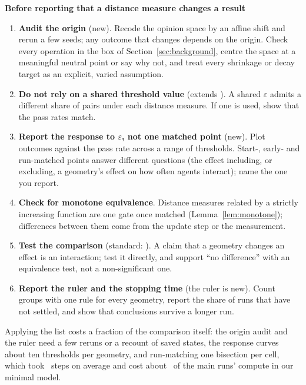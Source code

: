 \documentclass[11pt]{article}
\begin{document}
\begin{framed}
\noindent\textbf{Before reporting that a distance measure changes a result}
\begin{enumerate}
\item \textbf{Audit the origin} (new). Recode the opinion space by an affine shift and rerun a few seeds; any outcome that changes depends on the origin. Check every operation in the box of Section~\ref{sec:background}, centre the space at a meaningful neutral point or say why not, and treat every shrinkage or decay target as an explicit, varied assumption.
\item \textbf{Do not rely on a shared threshold value} (extends \citealp{lorenz2008}). A shared $\varepsilon$ admits a different share of pairs under each distance measure. If one is used, show that the pass rates match.
\item \textbf{Report the response to $\varepsilon$, not one matched point} (new). Plot outcomes against the pass rate across a range of thresholds. Start-, early- and run-matched points answer different questions (the effect including, or excluding, a geometry's effect on how often agents interact); name the one you report.
\item \textbf{Check for monotone equivalence}. Distance measures related by a strictly increasing function are one gate once matched (Lemma~\ref{lem:monotone}); differences between them come from the update step or the measurement.
\item \textbf{Test the comparison} (standard: \citealp{gelman2006,lakens2017}). A claim that a geometry changes an effect is an interaction; test it directly, and support ``no difference'' with an equivalence test, not a non-significant one.
\item \textbf{Report the ruler and the stopping time} (the ruler is new). Count groups with one rule for every geometry, report the share of runs that have not settled, and show that conclusions survive a longer run.
\end{enumerate}
\end{framed}
\noindent Applying the list costs a fraction of the comparison itself: the origin audit and the ruler need a few reruns or a recount of saved states, the response curves about ten thresholds per geometry, and run-matching one bisection per cell, which took \VCalIterMean\ steps on average and cost about \VCalCostShare\ of the main runs' compute in our minimal model.
\end{document}
